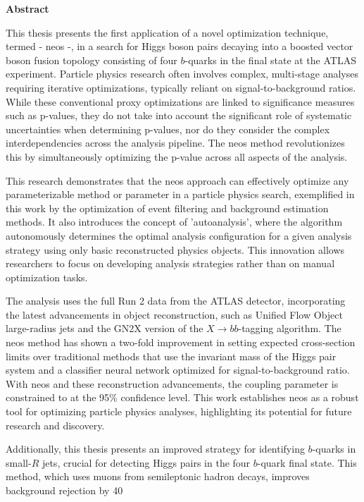 \begin{center}
\textbf{Abstract}
\end{center}
\noindent This thesis presents the first application of a novel optimization technique, termed - \acf{neos} -, in a search for Higgs boson pairs decaying into a boosted vector boson fusion topology consisting of four $b$-quarks in the final state at the ATLAS experiment. Particle physics research often involves complex, multi-stage analyses requiring iterative optimizations, typically reliant on signal-to-background ratios. While these conventional proxy optimizations are linked to  significance measures such as p-values, they do not take into account the significant role of systematic uncertainties when determining p-values, nor do they consider the complex interdependencies across the analysis pipeline. The \ac{neos} method revolutionizes this by simultaneously optimizing the p-value across all aspects of the analysis.

This research demonstrates that the \ac{neos} approach can effectively optimize any parameterizable method or parameter in a particle physics search, exemplified in this work by the optimization of event filtering and background estimation methods. It also introduces the concept of 'autoanalysis', where the algorithm autonomously determines the optimal analysis configuration for a given analysis strategy using only basic reconstructed physics objects. This innovation allows researchers to focus on developing analysis strategies rather than on manual optimization tasks.

The analysis uses the full Run 2 data from the ATLAS detector, incorporating the latest advancements in object reconstruction, such as Unified Flow Object large-radius jets and the GN2X version of the $X\rightarrow bb$-tagging algorithm. The \ac{neos} method has shown a two-fold improvement in setting expected cross-section limits over traditional methods that use the invariant mass of the Higgs pair system and a classifier neural network optimized for signal-to-background ratio.  With \ac{neos} and these reconstruction advancements, the \ktwov coupling parameter is constrained to  at the 95\% confidence level. This work establishes \ac{neos} as a robust tool for optimizing particle physics analyses, highlighting its potential for future research and discovery.

Additionally, this thesis presents an improved strategy for identifying $b$-quarks in small-$R$ jets, crucial for detecting Higgs pairs in the four $b$-quark final state. This method, which uses muons from semileptonic hadron decays, improves background rejection by 40%

